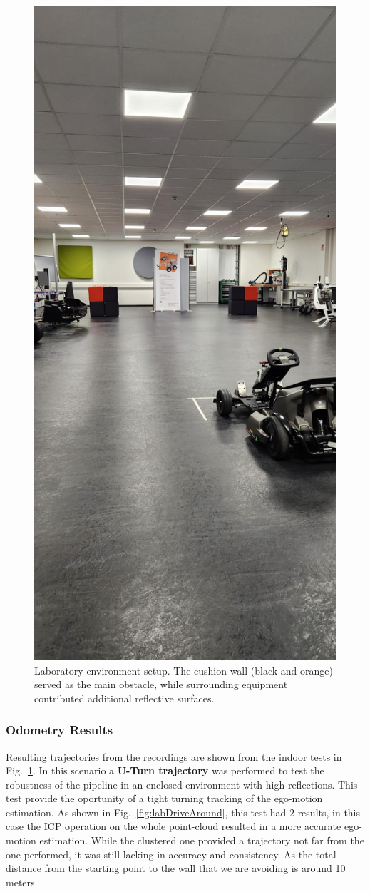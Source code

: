 \begin{figure}[!htbp]
    \centering
    \includegraphics[width=0.75\linewidth]{images/labSetup.png}
    \caption{Laboratory environment setup. The cushion wall (black and orange) served as the main obstacle, while surrounding equipment contributed additional reflective surfaces.}
    \label{fig:lab_setup}
\end{figure}

\subsubsection{Odometry Results}
Resulting trajectories from the recordings are shown from the indoor tests in Fig.~\ref{fig:lab_setup}.
In this scenario a \textbf{U-Turn trajectory} was performed to test the robustness of the pipeline in an enclosed environment with high reflections.
This test provide the oportunity of a tight turning tracking of the ego-motion estimation.
As shown in Fig.~\ref{fig:labDriveAround}, this test had 2 results, in this case the ICP operation on the whole point-cloud resulted in a more accurate ego-motion estimation.
While the clustered one provided a trajectory not far from the one performed, it was still lacking in accuracy and consistency.
As the total distance from the starting point to the wall that we are avoiding is around 10 meters.

